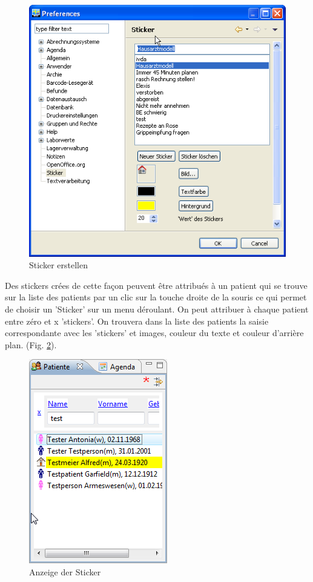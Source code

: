 \begin{figure}
    \includegraphics{images/etikette1}
    \caption{Sticker erstellen}
    \label{fig:etiketten1}
\end{figure}

Des stickers crées de cette façon peuvent être attribués à un patient qui se trouve sur la liste des patients par un clic sur la touche droite de la souris ce qui permet de choisir un 'Sticker' sur un menu déroulant. On peut attribuer à chaque patient entre zéro et x 'stickers'. On trouvera dans la liste des patients la saisie correspondante avec les 'stickers' et images, couleur du texte et couleur d'arrière plan.  (Fig. \ref{fig:etiketten2}).
\begin{figure}
    \includegraphics{images/etikette3}
    \caption{Anzeige der Sticker}
    \label{fig:etiketten2}
\end{figure}

